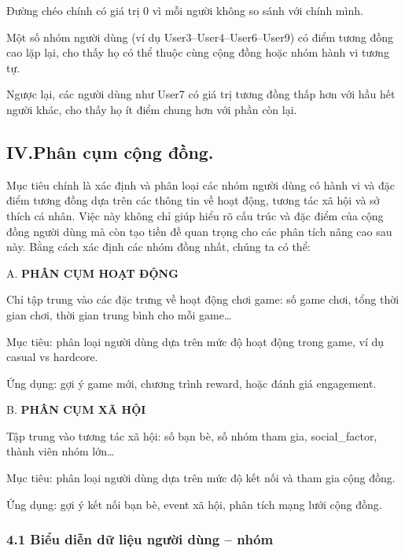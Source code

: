 \documentclass[
  11pt,
]{article}
\begin{document}
Đường chéo chính có giá trị 0 vì mỗi người không so sánh với chính mình.

Một số nhóm người dùng (ví dụ User3--User4--User6--User9) có điểm tương
đồng cao lặp lại, cho thấy họ có thể thuộc cùng cộng đồng hoặc nhóm hành
vi tương tự.

Ngược lại, các người dùng như User7 có giá trị tương đồng thấp hơn với
hầu hết người khác, cho thấy họ ít điểm chung hơn với phần còn lại.

\hypertarget{iv.phuxe2n-cux1ee5m-cux1ed9ng-ux111ux1ed3ng.}{%
\subsection{IV.Phân cụm cộng
đồng.}\label{iv.phuxe2n-cux1ee5m-cux1ed9ng-ux111ux1ed3ng.}}

Mục tiêu chính là xác định và phân loại các nhóm người dùng có hành vi
và đặc điểm tương đồng dựa trên các thông tin về hoạt động, tương tác xã
hội và sở thích cá nhân. Việc này không chỉ giúp hiểu rõ cấu trúc và đặc
điểm của cộng đồng người dùng mà còn tạo tiền đề quan trọng cho các phân
tích nâng cao sau này. Bằng cách xác định các nhóm đồng nhất, chúng ta
có thể:

A. \textbf{PHÂN CỤM HOẠT ĐỘNG}

Chỉ tập trung vào các đặc trưng về hoạt động chơi game: số game chơi,
tổng thời gian chơi, thời gian trung bình cho mỗi game\ldots{}

Mục tiêu: phân loại người dùng dựa trên mức độ hoạt động trong game, ví
dụ casual vs hardcore.

Ứng dụng: gợi ý game mới, chương trình reward, hoặc đánh giá engagement.

B. \textbf{PHÂN CỤM XÃ HỘI}

Tập trung vào tương tác xã hội: số bạn bè, số nhóm tham gia,
social\_factor, thành viên nhóm lớn\ldots{}

Mục tiêu: phân loại người dùng dựa trên mức độ kết nối và tham gia cộng
đồng.

Ứng dụng: gợi ý kết nối bạn bè, event xã hội, phân tích mạng lưới cộng
đồng.

\hypertarget{biux1ec3u-diux1ec5n-dux1eef-liux1ec7u-ngux1b0ux1eddi-duxf9ng-nhuxf3m}{%
\subsubsection{4.1 Biểu diễn dữ liệu người dùng --
nhóm}\label{biux1ec3u-diux1ec5n-dux1eef-liux1ec7u-ngux1b0ux1eddi-duxf9ng-nhuxf3m}}
\end{document}
